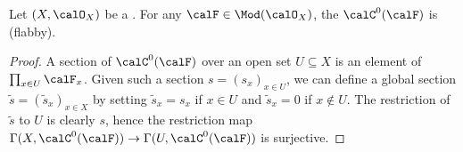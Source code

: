 \begin{lemma} \label{lemma:godement_sheaf_of_a_sheaf_of_modules_on_a_ringed_space_is_flasque}
    Let $(X,\calO_X)$ be a .
    For any $\calF \in \Mod(\calO_X)$, the  $\calC^0(\calF)$ is  (flabby).
\end{lemma}
\begin{proof}
    A section of $\calC^0(\calF)$ over an open set $U \subseteq X$ is an element of $\prod_{x \in U} \calF_x$. Given such a section $s = (s_x)_{x \in U}$, we can define a global section $\tilde{s} = (\tilde{s}_x)_{x \in X}$ by setting $\tilde{s}_x = s_x$ if $x \in U$ and $\tilde{s}_x = 0$ if $x \notin U$. The restriction of $\tilde{s}$ to $U$ is clearly $s$, hence the restriction map $\Gamma(X, \calC^0(\calF)) \to \Gamma(U, \calC^0(\calF))$ is surjective.
\end{proof}